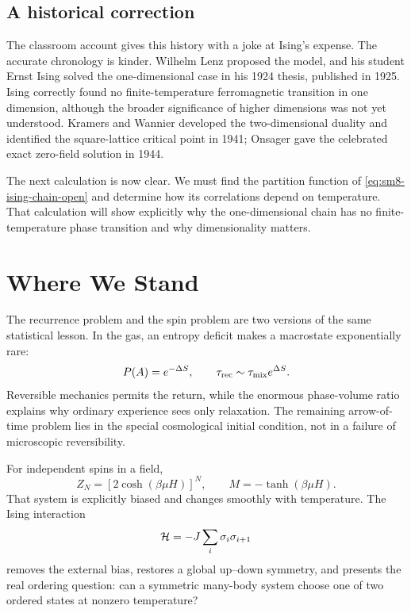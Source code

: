 \subsection{A historical correction}

The classroom account gives this history with a joke at Ising's expense.
The accurate chronology is kinder.  Wilhelm Lenz proposed the model, and his
student Ernst Ising solved the one-dimensional case in his 1924 thesis,
published in 1925.  Ising correctly found no finite-temperature
ferromagnetic transition in one dimension, although the broader significance
of higher dimensions was not yet understood.  Kramers and Wannier developed
the two-dimensional duality and identified the square-lattice critical point
in 1941; Onsager gave the celebrated exact zero-field solution in 1944.

The next calculation is now clear.  We must find the partition function of
\eqref{eq:sm8-ising-chain-open} and determine how its correlations depend on
temperature.  That calculation will show explicitly why the one-dimensional
chain has no finite-temperature phase transition and why dimensionality
matters.

\section{Where We Stand}

The recurrence problem and the spin problem are two versions of the same
statistical lesson.  In the gas, an entropy deficit makes a macrostate
exponentially rare:
\begin{equation}
 P(A)=e^{-\Delta S},
 \qquad
 \tau_{\rm rec}\sim\tau_{\rm mix}e^{\Delta S}.
 \label{eq:sm8-summary-recurrence}
\end{equation}
Reversible mechanics permits the return, while the enormous phase-volume
ratio explains why ordinary experience sees only relaxation.  The remaining
arrow-of-time problem lies in the special cosmological initial condition, not
in a failure of microscopic reversibility.

For independent spins in a field,
\begin{equation}
 Z_N=\left[2\cosh(\beta\mu H)\right]^N,
 \qquad
 M=-\tanh(\beta\mu H).
 \label{eq:sm8-summary-spins}
\end{equation}
That system is explicitly biased and changes smoothly with temperature.  The
Ising interaction
\begin{equation}
 {\cal H}=-J\sum_i\sigma_i\sigma_{i+1}
 \label{eq:sm8-summary-ising}
\end{equation}
removes the external bias, restores a global up--down symmetry, and presents
the real ordering question: can a symmetric many-body system choose one of
two ordered states at nonzero temperature?
